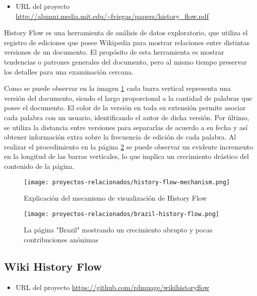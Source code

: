 \begin{itemize}
    \item URL del proyecto \url{http://alumni.media.mit.edu/~fviegas/papers/history_flow.pdf} \cite{HistoryFlowVisualizations}
\end{itemize}

History Flow es una herramienta de análisis de datos exploratorio, que utiliza el registro de ediciones que posee Wikipedia para mostrar relaciones entre distintas versiones de un documento. El propósito de esta herramienta es mostrar tendencias o patrones generales del documento, pero al mismo tiempo preservar los detalles para una examinación cercana.

Como se puede observar en la imagen \ref*{fig:history-flow-mechanism} cada barra vertical representa una versión del documento, siendo el largo proporcional a la cantidad de palabras que posee el documento. El color de la versión en toda su extensión permite asociar cada palabra con un usuario, identificando el autor de dicha versión. Por último, se utiliza la distancia entre versiones para separarlas de acuerdo a su fecha y así obtener información extra sobre la frecuencia de edición de cada palabra. Al realizar el procedimiento en la página  \ref*{fig:brazil-history-flow} se puede observar un evidente incremento en la longitud de las barras verticales, lo que implica un crecimiento drástico del contenido de la página.

\begin{figure}[H]
    \centering
    \texttt{[image: proyectos-relacionados/history-flow-mechanism.png]}
    \caption{Explicación del mecanismo de visualización de History Flow \cite{HistoryFlowVisualizations}}
    \label{fig:history-flow-mechanism}
\end{figure}

\begin{figure}[H]
    \centering
    \texttt{[image: proyectos-relacionados/brazil-history-flow.png]}
    \caption{La página "Brazil" mostrando un crecimiento abrupto y pocas contribuciones anónimas}
    \label{fig:brazil-history-flow}
\end{figure}

\subsection{Wiki History Flow}

\begin{itemize}
    \item URL del proyecto \url{https://github.com/rdmpage/wikihistoryflow}
\end{itemize}

